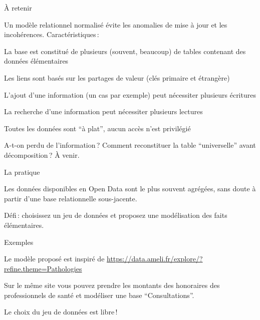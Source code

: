 
\begin{frame}{À retenir}

Un modèle relationnel normalisé évite les \alert{anomalies de mise à jour} et
les \alert{incohérences}.
\vfill
Caractéristiques\,:

\begin{redbullet}
  \item La base est constitué de plusieurs (souvent, beaucoup) de tables
      contenant des données élémentaires
 \item Les liens sont basés sur les partages de valeur (clés primaire et étrangère)
 \item L'ajout d'une information (un cas par exemple) peut nécessiter 
        plusieurs écritures
 \item La recherche d'une information peut nécessiter plusieurs lectures
 \item Toutes les données sont ``à plat'', aucun accès n'est privilégié
\end{redbullet}

\vfill

\alert{A-t-on perdu de l'information}\,? Comment reconstituer la table ``universelle'' 
avant décomposition\,? À venir.
\end{frame}



\begin{frame}{La pratique}

Les données disponibles en Open Data sont le plus souvent agrégées, sans doute
à partir d'une base relationnelle sous-jacente.

\vfill

Défi\,: choisissez un jeu de données et proposez une modélisation
des faits élémentaires.

\vfill

Exemples
\begin{redbullet}
  \item Le modèle proposé est inspiré de \url{https://data.ameli.fr/explore/?refine.theme=Pathologies}
  \item Sur le même site vous pouvez prendre les montants des honoraires 
  des professionnels de santé et modéliser une base ``Consultations''.
  \item Le choix du jeu de données est libre\,!
\end{redbullet}

\end{frame}

